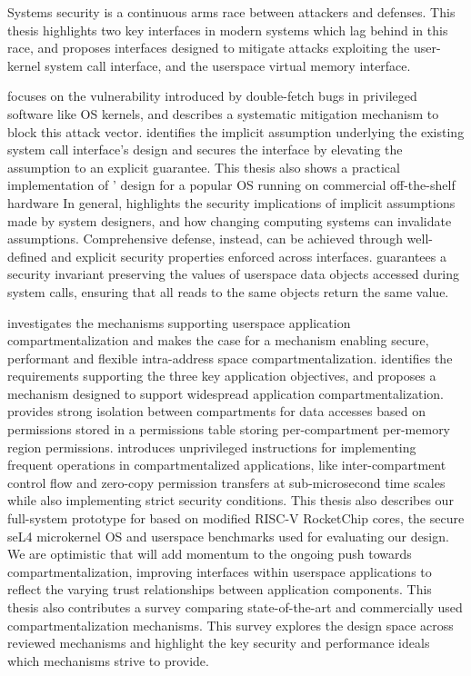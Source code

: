 Systems security is a continuous arms race between attackers and defenses.
This thesis highlights two key interfaces in modern systems which lag
behind in this race, and proposes interfaces designed to mitigate attacks
exploiting the user-kernel system call interface, and the
userspace virtual memory interface.

\midas focuses on the vulnerability introduced by double-fetch bugs in
privileged software like OS kernels, and describes a systematic mitigation
mechanism to block this attack vector.
\midas identifies the implicit assumption underlying the existing system call 
interface's design and secures the interface by elevating the assumption to
an explicit guarantee.
This thesis also shows a practical implementation of \midas' design for
a popular OS running on commercial off-the-shelf hardware
In general, \midas highlights the security implications of implicit assumptions
made by system designers, and 
how changing computing systems can invalidate assumptions.
Comprehensive defense, instead, can be achieved through well-defined and
explicit security properties enforced across interfaces.
\midas guarantees a security invariant preserving the values of userspace data
objects accessed during system calls, ensuring that all reads to the same
objects return the same value.

\seccells investigates the mechanisms supporting userspace application
compartmentalization and makes the case for a mechanism enabling 
secure, performant and flexible intra-address space compartmentalization.
\seccells identifies the requirements supporting the three key application
objectives, and proposes a mechanism designed to support widespread
application compartmentalization.
\seccells provides strong isolation between compartments for data accesses
based on permissions stored in a permissions table storing
per-compartment per-memory region permissions.
\seccells introduces unprivileged instructions for implementing frequent 
operations in compartmentalized applications, like inter-compartment
control flow and zero-copy permission transfers at sub-microsecond time
scales while also implementing strict security conditions.
This thesis also describes our full-system prototype for \seccells based
on modified RISC-V RocketChip cores, the secure seL4 microkernel OS and
userspace benchmarks used for evaluating our design.
We are optimistic that \seccells will add momentum to the ongoing push
towards compartmentalization, improving interfaces within userspace applications
to reflect the varying trust relationships between application components.
This thesis also contributes a survey comparing state-of-the-art and
commercially used compartmentalization mechanisms.
This survey explores the design space across reviewed mechanisms and 
highlight the key security and performance ideals which mechanisms strive to
provide.

